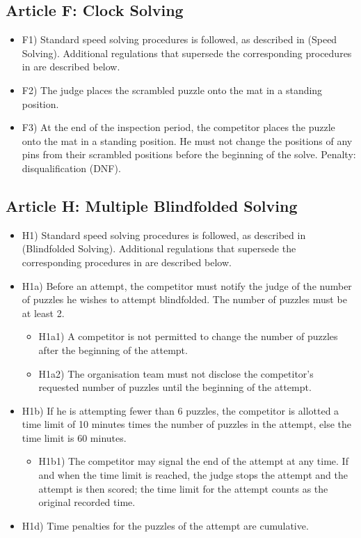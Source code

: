 \subsection{ Article F: Clock Solving}

\begin{itemize}
\item
  F1) Standard speed solving procedures is followed, as described in
  (Speed Solving). Additional regulations that supersede the
  corresponding procedures in are described below.
\item
  F2) The judge places the scrambled puzzle onto the mat in a standing
  position.
\item
  F3) At the end of the inspection period, the competitor places the
  puzzle onto the mat in a standing position. He must not change the
  positions of any pins from their scrambled positions before the
  beginning of the solve. Penalty: disqualification (DNF).
\end{itemize}

\subsection{ Article H: Multiple Blindfolded Solving}

\begin{itemize}
\item
  H1) Standard speed solving procedures is followed, as described in
  (Blindfolded Solving). Additional regulations that supersede the
  corresponding procedures in are described below.
\item
  H1a) Before an attempt, the competitor must notify the judge of the
  number of puzzles he wishes to attempt blindfolded. The number of
  puzzles must be at least 2.

  \begin{itemize}
  \item
    H1a1) A competitor is not permitted to change the number of puzzles
    after the beginning of the attempt.
  \item
    H1a2) The organisation team must not disclose the competitor's
    requested number of puzzles until the beginning of the attempt.
  \end{itemize}
\item
  H1b) If he is attempting fewer than 6 puzzles, the competitor is
  allotted a time limit of 10 minutes times the number of puzzles in the
  attempt, else the time limit is 60 minutes.

  \begin{itemize}
  \item
    H1b1) The competitor may signal the end of the attempt at any time.
    If and when the time limit is reached, the judge stops the attempt
    and the attempt is then scored; the time limit for the attempt
    counts as the original recorded time.
  \end{itemize}
\item
  H1d) Time penalties for the puzzles of the attempt are cumulative.
\end{itemize}

